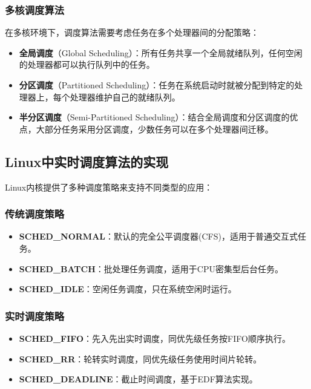 \subsubsection{多核调度算法}

在多核环境下，调度算法需要考虑任务在多个处理器间的分配策略：

\begin{itemize}
    \item \textbf{全局调度}（Global Scheduling）：所有任务共享一个全局就绪队列，任何空闲的处理器都可以执行队列中的任务。
    \item \textbf{分区调度}（Partitioned Scheduling）：任务在系统启动时就被分配到特定的处理器上，每个处理器维护自己的就绪队列。
    \item \textbf{半分区调度}（Semi-Partitioned Scheduling）：结合全局调度和分区调度的优点，大部分任务采用分区调度，少数任务可以在多个处理器间迁移。
\end{itemize}

\subsection{Linux中实时调度算法的实现}

Linux内核提供了多种调度策略来支持不同类型的应用：

\subsubsection{传统调度策略}

\begin{itemize}
    \item \textbf{SCHED\_NORMAL}：默认的完全公平调度器(CFS)，适用于普通交互式任务。
    \item \textbf{SCHED\_BATCH}：批处理任务调度，适用于CPU密集型后台任务。
    \item \textbf{SCHED\_IDLE}：空闲任务调度，只在系统空闲时运行。
\end{itemize}

\subsubsection{实时调度策略}

\begin{itemize}
    \item \textbf{SCHED\_FIFO}：先入先出实时调度，同优先级任务按FIFO顺序执行。
    \item \textbf{SCHED\_RR}：轮转实时调度，同优先级任务使用时间片轮转。
    \item \textbf{SCHED\_DEADLINE}：截止时间调度，基于EDF算法实现。
\end{itemize}

